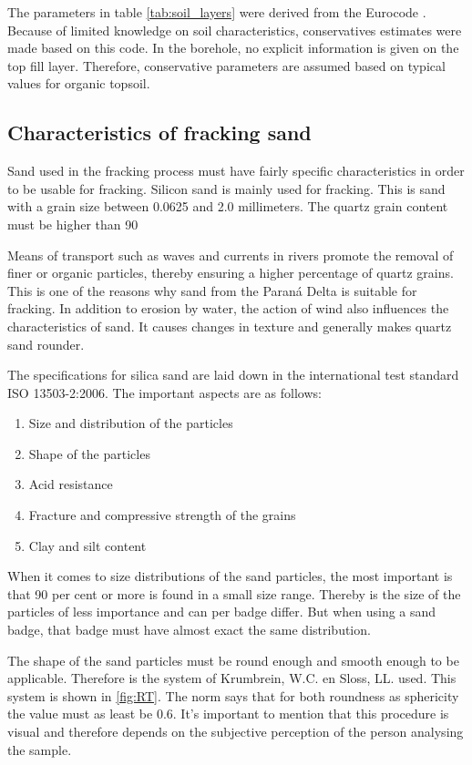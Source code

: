 The parameters in table \ref{tab:soil_layers} were derived from the Eurocode \autocite{stichtingkoninklijknederlandsnormalisatieinstituutNederlandseNormNEN2025}. Because of limited knowledge on soil characteristics, conservatives estimates were made based on this code. In the borehole, no explicit information is given on the top fill layer. Therefore, conservative parameters are assumed based on typical values for organic topsoil.

\subsection{Characteristics of fracking sand}
Sand used in the fracking process must have fairly specific characteristics in order to be usable for fracking. Silicon sand is mainly used for fracking. This is sand with a grain size between 0.0625 and 2.0 millimeters. The quartz grain content must be higher than 90%

Means of transport such as waves and currents in rivers promote the removal of finer or organic particles, thereby ensuring a higher percentage of quartz grains. This is one of the reasons why sand from the Paraná Delta is suitable for fracking.
In addition to erosion by water, the action of wind also influences the characteristics of sand. It causes changes in texture and generally makes quartz sand rounder. 

The specifications for silica sand are laid down in the international test standard ISO 13503-2:2006. The important aspects are as follows:

\begin{enumerate}
    \item  Size and distribution of the particles
    \item Shape of the particles
    \item Acid resistance 
    \item Fracture and compressive strength of the grains
    \item Clay and silt content
\end{enumerate}

When it comes to size distributions of the sand particles, the most important is that 90 per cent or more is found in a small size range. Thereby is the size of the particles of less importance and can per badge differ. But when using a sand badge, that badge must have almost exact the same distribution. 

The shape of the sand particles must be round enough and smooth enough to be applicable. Therefore is the system of Krumbrein, W.C. en Sloss, LL. used. This system is shown in \ref{fig:RT}. The norm says that for both roundness as sphericity the value must as least be 0.6. It's important to mention that this procedure is visual and therefore depends on the subjective perception of the person analysing the sample.


